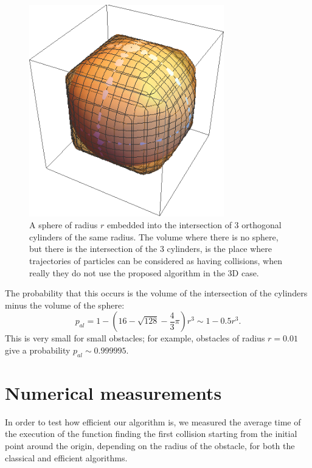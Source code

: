 \documentclass[pre,amsmath,amssymb, twocolumn, showpacs]{revtex4-1}
\newcommand{\pp}{p_{al}}
\begin{document}
\begin{figure}
\centering
\includegraphics [width=240pt]{./region.png}
\caption{A sphere of radius $r$ embedded into the intersection of 3 orthogonal cylinders of the same radius. The volume where there is no sphere, but there is the intersection of the 3 cylinders, is the place where trajectories of particles can be considered as having collisions, when really they do not use the proposed algorithm in the 3D case.}
\label{fig:collision}
\end{figure}

 
 The probability that this occurs is the volume of the intersection of the cylinders minus the volume of the sphere:
%
\begin{equation}
\pp= 1-(16-\sqrt{128}-\frac{4}{3} \pi) r^3 \sim 1-0.5 r^3.
\end{equation}
This is very small for small obstacles; for example, obstacles of radius $r=0.01$ give a probability $\pp \sim 0.999995$.

\section{Numerical measurements}

In order to test how efficient our algorithm is, we measured the average time of the execution of the function finding the first collision starting from the initial point around the origin,
 depending on the radius of the obstacle, for both the classical and efficient algorithms.
\end{document}
